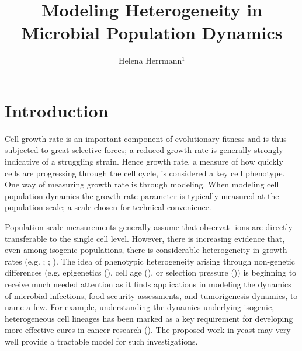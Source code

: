 \documentclass{bioinfo}
\begin{document}

\title[Project Proposal]{\Large{Modeling Heterogeneity in Microbial Population Dynamics}}
\author[Helena Herrmann]{Helena Herrmann$^{1}$}
\address{$^{1}$School of Computing Science, Newcastle University, UK}

\vspace{-3em}
\maketitle

\section{Introduction}

Cell growth rate is an important component of evolutionary fitness and is thus subjected to great selective forces; a reduced growth rate is generally strongly indicative of a struggling strain. Hence growth rate, a measure of how quickly cells are progressing through the cell cycle, is considered a key cell phenotype. One way of measuring growth rate is through modeling. When modeling cell population dynamics the growth rate parameter is typically measured at the population scale; a scale chosen for technical convenience. 

Population scale measurements generally assume that observat- ions are directly transferable to the single cell level. However, there is increasing evidence that, even among isogenic populations, there is considerable heterogeneity in growth rates (e.g. \citealp{Pin06}; \citealp{Schmidt12}; \citealp{Levy12}). The idea of phenotypic heterogeneity arising through non-genetic differences (e.g. epigenetics (\citealp{Bird07}), cell age (\citealp{Ginovart11}), or selection pressure (\citealp{Navin11})) is beginning to receive much needed attention as it finds applications in modeling the dynamics of microbial infections, food security assessments, and tumorigenesis dynamics, to name a few.  For example, understanding the dynamics underlying isogenic, heterogeneous cell lineages has been marked as a key requirement for developing more effective cures in cancer research (\citealp{Tabassum15}). The proposed work in yeast may very well provide a tractable model for such investigations. 
\end{document}
